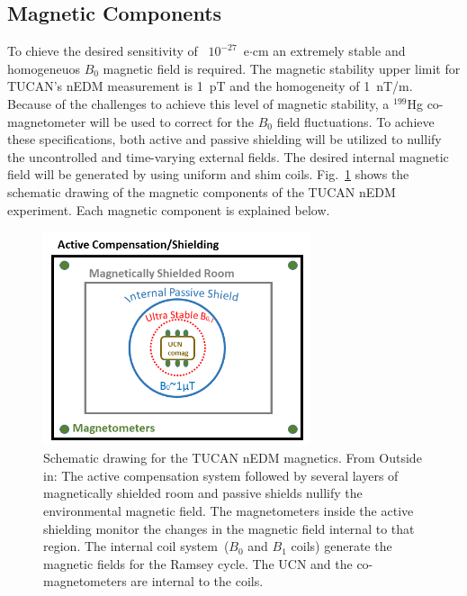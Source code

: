 \subsection{Magnetic Components}
To chieve the desired sensitivity of ~$10^{-27}$~e$\cdot$cm an
extremely stable and homogeneuos $B_0$ magnetic field is required.
The magnetic stability upper limit for TUCAN's nEDM
measurement is 1~pT and the homogeneity of 1~nT/m.
Because of the challenges to achieve this level of magnetic stability,
a $^{199}$Hg co-magnetometer will be used to correct for the $B_0$
field fluctuations. To achieve these specifications, both active and
passive shielding will be utilized to nullify the uncontrolled and
time-varying external fields. The desired internal magnetic field will
be generated by using uniform and shim
coils. Fig.~\ref{fig:magneticscheme} shows the schematic drawing of
the magnetic components of the TUCAN nEDM experiment. Each magnetic
component is explained below.

\begin{figure}[h!]
  \centering
  \includegraphics[width=0.7\textwidth]{magneticscheme.png}
  \caption{Schematic drawing for the TUCAN nEDM magnetics. From
    Outside in: The active compensation system followed by several
    layers of magnetically shielded room and passive shields nullify
    the environmental magnetic field. The magnetometers inside the
    active shielding monitor the changes in the magnetic field
    internal to that region. The internal coil system~($B_0$ and $B_1$
    coils) generate the magnetic fields for the Ramsey cycle. The UCN
    and the co-magnetometers are internal to the coils.  }
  \label{fig:magneticscheme}
\end{figure}



